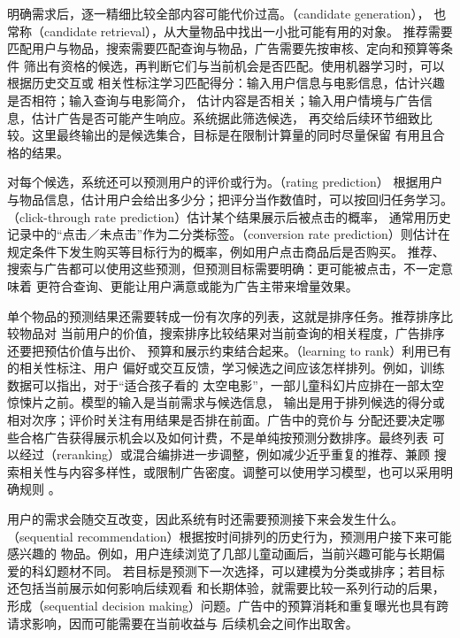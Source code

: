 明确需求后，逐一精细比较全部内容可能代价过高。（candidate generation），
也常称（candidate retrieval），从大量物品中找出一小批可能有用的对象。
推荐需要匹配用户与物品，搜索需要匹配查询与物品，广告需要先按审核、定向和预算等条件
筛出有资格的候选，再判断它们与当前机会是否匹配。使用机器学习时，可以根据历史交互或
相关性标注学习匹配得分：输入用户信息与电影信息，估计兴趣是否相符；输入查询与电影简介，
估计内容是否相关；输入用户情境与广告信息，估计广告是否可能产生响应。系统据此筛选候选，
再交给后续环节细致比较。这里最终输出的是候选集合，目标是在限制计算量的同时尽量保留
有用且合格的结果。

对每个候选，系统还可以预测用户的评价或行为。（rating prediction）
根据用户与物品信息，估计用户会给出多少分；把评分当作数值时，可以按回归任务学习。
（click-through rate prediction）估计某个结果展示后被点击的概率，
通常用历史记录中的“点击／未点击”作为二分类标签。（conversion rate
prediction）则估计在规定条件下发生购买等目标行为的概率，例如用户点击商品后是否购买。
推荐、搜索与广告都可以使用这些预测，但预测目标需要明确：更可能被点击，不一定意味着
更符合查询、更能让用户满意或能为广告主带来增量效果。

单个物品的预测结果还需要转成一份有次序的列表，这就是排序任务。推荐排序比较物品对
当前用户的价值，搜索排序比较结果对当前查询的相关程度，广告排序还要把预估价值与出价、
预算和展示约束结合起来。（learning to rank）利用已有的相关性标注、用户
偏好或交互反馈，学习候选之间应该怎样排列。例如，训练数据可以指出，对于“适合孩子看的
太空电影”，一部儿童科幻片应排在一部太空惊悚片之前。模型的输入是当前需求与候选信息，
输出是用于排列候选的得分或相对次序；评价时关注有用结果是否排在前面。广告中的竞价与
分配还要决定哪些合格广告获得展示机会以及如何计费，不是单纯按预测分数排序。最终列表
可以经过（reranking）或混合编排进一步调整，例如减少近乎重复的推荐、兼顾
搜索相关性与内容多样性，或限制广告密度。调整可以使用学习模型，也可以采用明确规则
。

用户的需求会随交互改变，因此系统有时还需要预测接下来会发生什么。
（sequential recommendation）根据按时间排列的历史行为，预测用户接下来可能感兴趣的
物品。例如，用户连续浏览了几部儿童动画后，当前兴趣可能与长期偏爱的科幻题材不同。
若目标是预测下一次选择，可以建模为分类或排序；若目标还包括当前展示如何影响后续观看
和长期体验，就需要比较一系列行动的后果，形成（sequential decision
making）问题。广告中的预算消耗和重复曝光也具有跨请求影响，因而可能需要在当前收益与
后续机会之间作出取舍。

